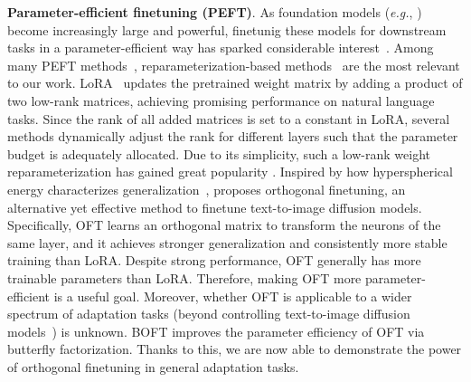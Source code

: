 \textbf{Parameter-efficient finetuning (PEFT)}. As foundation models (\emph{e.g.}, \cite{brown2020language,radford2021learning,rombach2022high,kirillov2023segment})  become increasingly large and powerful, finetunig these models for downstream tasks in a parameter-efficient way has sparked considerable interest~\cite{treviso2023efficient,ding2023parameter,lialin2023scaling}. Among many PEFT methods~\cite{houlsby2019parameter,aghajanyan2020intrinsic,hulora2022,edalati2022krona,wang2022adamix,gheini2021cross,zaken2022bitfit,guo2020parameter,sung2021training,ansell2022composable,lester2021power,li2021prefix,vu2022spot,he2021towards,mao2021unipelt,karimi2021compacter,liu2022few,sung2022lst,chen2022parameter,jia2022visual,chen2022adaptformer,zhang2022neural,jie2023fact,lian2022scaling,luo2023towards}, reparameterization-based methods~\cite{aghajanyan2020intrinsic,hulora2022,edalati2022krona} are the most relevant to our work. LoRA~\cite{hulora2022} updates the pretrained weight matrix by adding a product of two low-rank matrices, achieving promising performance on natural language tasks. Since the rank of all added matrices is set to a constant in LoRA, several methods \cite{zhang2022adaptive,valipour2022dylora,zhang2023increlora} dynamically adjust the rank for different layers such that the parameter budget is adequately allocated. Due to its simplicity, such a low-rank weight reparameterization has gained great popularity \cite{dettmers2023qlora,zi2023delta,chavan2023one}. Inspired by how hyperspherical energy characterizes generalization~\cite{liu2018learning,liu2021orthogonal}, \cite{qiu2023controlling} proposes orthogonal finetuning, an alternative yet effective method to finetune text-to-image diffusion models. Specifically, OFT learns an orthogonal matrix to transform the neurons of the same layer, and it achieves stronger generalization and consistently more stable training than LoRA. Despite strong performance, OFT generally has more trainable parameters than LoRA. Therefore, making OFT more parameter-efficient is a useful goal. Moreover, whether OFT is applicable to a wider spectrum of adaptation tasks (beyond controlling text-to-image diffusion models~\cite{qiu2023controlling}) is unknown. BOFT improves the parameter efficiency of OFT via butterfly factorization. Thanks to this, we are now able to demonstrate the power of orthogonal finetuning in general adaptation tasks.

